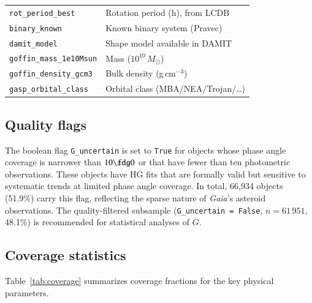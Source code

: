 \documentclass{aa}
\newcommand{\gaia}{{\it Gaia}\xspace}
\begin{document}
\begin{table}
\begin{tabular}{lp{5.2cm}}
\texttt{rot\_period\_best} & Rotation period (h), from LCDB \\
\texttt{binary\_known}     & Known binary system (Pravec) \\
\texttt{damit\_model}      & Shape model available in DAMIT \\
\texttt{goffin\_mass\_1e10Msun} & Mass ($10^{10}\,M_\odot$) \\
\texttt{goffin\_density\_gcm3}  & Bulk density (g\,cm$^{-3}$) \\
\texttt{gasp\_orbital\_class}   & Orbital class (MBA/NEA/Trojan/\ldots) \\
\bottomrule
\end{tabular}
\end{table}

\subsection{Quality flags}
\label{sec:flags}

The boolean flag \texttt{G\_uncertain} is set to \texttt{True} for objects
whose phase angle coverage is narrower than $10\fdg0$ or that have fewer
than ten photometric observations.  These objects have HG fits that are
formally valid but sensitive to systematic trends at limited phase angle
coverage.  In total, 66,934 objects (51.9\%) carry this flag, reflecting
the sparse nature of \gaia's asteroid observations.  The quality-filtered
subsample (\texttt{G\_uncertain = False}, $n = 61\,951$, 48.1\%) is
recommended for statistical analyses of $G$.

\subsection{Coverage statistics}
\label{sec:coverage}

Table~\ref{tab:coverage} summarizes coverage fractions for the key
physical parameters.
\end{document}
